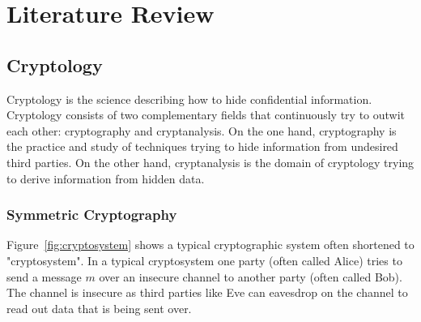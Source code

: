 \chapter{Literature Review}
\label{cha:2}

\section{Cryptology}
Cryptology is the science describing how to hide confidential information. Cryptology consists of two complementary fields that continuously try to outwit each other: cryptography and cryptanalysis. On the one hand, cryptography is the practice and study of techniques trying to hide information from undesired third parties. On the other hand, cryptanalysis is the domain of cryptology trying to derive information from hidden data.

\subsection{Symmetric Cryptography}
Figure~\ref{fig:cryptosystem} shows a typical cryptographic system often shortened to "cryptosystem". In a typical cryptosystem one party (often called Alice) tries to send a message $m$ over an insecure channel to another party (often called Bob). The channel is insecure as third parties like Eve can eavesdrop on the channel to read out data that is being sent over.

